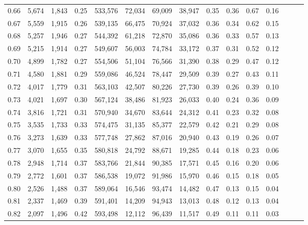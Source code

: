 \begin{tabular}{rrrrrrrrrrrrrrr}
0.66 &   5,674 &  1,843 &  0.25 &  533,576 &   72,034 &   69,009 &   38,947 &  0.35 &  0.36 &  0.67 &      0.16 \\
0.67 &   5,559 &  1,915 &  0.26 &  539,135 &   66,475 &   70,924 &   37,032 &  0.36 &  0.34 &  0.62 &      0.15 \\
0.68 &   5,257 &  1,946 &  0.27 &  544,392 &   61,218 &   72,870 &   35,086 &  0.36 &  0.33 &  0.57 &      0.13 \\
0.69 &   5,215 &  1,914 &  0.27 &  549,607 &   56,003 &   74,784 &   33,172 &  0.37 &  0.31 &  0.52 &      0.12 \\
0.70 &   4,899 &  1,782 &  0.27 &  554,506 &   51,104 &   76,566 &   31,390 &  0.38 &  0.29 &  0.47 &      0.12 \\
0.71 &   4,580 &  1,881 &  0.29 &  559,086 &   46,524 &   78,447 &   29,509 &  0.39 &  0.27 &  0.43 &      0.11 \\
0.72 &   4,017 &  1,779 &  0.31 &  563,103 &   42,507 &   80,226 &   27,730 &  0.39 &  0.26 &  0.39 &      0.10 \\
0.73 &   4,021 &  1,697 &  0.30 &  567,124 &   38,486 &   81,923 &   26,033 &  0.40 &  0.24 &  0.36 &      0.09 \\
0.74 &   3,816 &  1,721 &  0.31 &  570,940 &   34,670 &   83,644 &   24,312 &  0.41 &  0.23 &  0.32 &      0.08 \\
0.75 &   3,535 &  1,733 &  0.33 &  574,475 &   31,135 &   85,377 &   22,579 &  0.42 &  0.21 &  0.29 &      0.08 \\
0.76 &   3,273 &  1,639 &  0.33 &  577,748 &   27,862 &   87,016 &   20,940 &  0.43 &  0.19 &  0.26 &      0.07 \\
0.77 &   3,070 &  1,655 &  0.35 &  580,818 &   24,792 &   88,671 &   19,285 &  0.44 &  0.18 &  0.23 &      0.06 \\
0.78 &   2,948 &  1,714 &  0.37 &  583,766 &   21,844 &   90,385 &   17,571 &  0.45 &  0.16 &  0.20 &      0.06 \\
0.79 &   2,772 &  1,601 &  0.37 &  586,538 &   19,072 &   91,986 &   15,970 &  0.46 &  0.15 &  0.18 &      0.05 \\
0.80 &   2,526 &  1,488 &  0.37 &  589,064 &   16,546 &   93,474 &   14,482 &  0.47 &  0.13 &  0.15 &      0.04 \\
0.81 &   2,337 &  1,469 &  0.39 &  591,401 &   14,209 &   94,943 &   13,013 &  0.48 &  0.12 &  0.13 &      0.04 \\
0.82 &   2,097 &  1,496 &  0.42 &  593,498 &   12,112 &   96,439 &   11,517 &  0.49 &  0.11 &  0.11 &      0.03 \\

\end{tabular}
